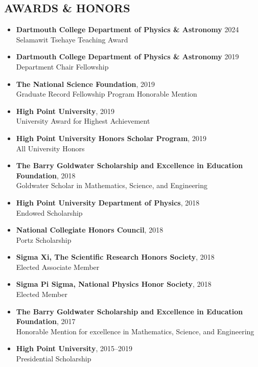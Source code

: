 \documentclass[margin, 10pt]{res} %
\begin{document}
\begin{resume}
\section{AWARDS \& HONORS}
\begin{itemize}
	\item \textbf{{\scriptsize Dartmouth College Department of Physics \& Astronomy}} {\small 2024}\\Selamawit Tsehaye Teaching Award
	\item \textbf{{\scriptsize Dartmouth College Department of Physics \& Astronomy}} {\small 2019}\\Department Chair Fellowship
    \item \textbf{{\scriptsize The National Science Foundation}}, {\small 2019}\\Graduate Record Fellowship Program Honorable Mention
    \item \textbf{{\scriptsize High Point University}},
    {\small 2019}\\University Award for Highest Achievement
    \item \textbf{{\scriptsize High Point University Honors Scholar Program}},
    {\small 2019}\\All University Honors
	\item \textbf{{\scriptsize The Barry Goldwater Scholarship and Excellence in Education Foundation}}, {\small 2018}\\Goldwater Scholar in Mathematics, Science, and Engineering 
    \item \textbf{{\scriptsize High Point University Department of Physics}}, {\small 2018}\\Endowed Scholarship
    \item {\scriptsize \textbf{National Collegiate Honors Council}}, {\small 2018}\\Portz Scholarship
    \item \textbf{{\scriptsize Sigma Xi, The Scientific Research Honors Society}}, {\small 2018}\\Elected Associate Member
     \item \textbf{{\scriptsize Sigma Pi Sigma, National Physics Honor Society}}, {\small 2018}\\Elected Member
    \item \textbf{{\scriptsize The Barry Goldwater Scholarship and Excellence in Education Foundation}}, {\small 2017}\\Honorable Mention for excellence in Mathematics, Science, and Engineering 
	\item \textbf{{\scriptsize High Point University}}, {\small 2015--2019}\\Presidential Scholarship
\end{itemize}


\end{resume}
\end{document}
